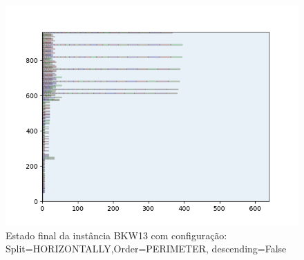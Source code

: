 \begin{figure}[H]
    \centering
    \caption[]{Estado final da instância BKW13 com configuração: Split=HORIZONTALLY,Order=PERIMETER, descending=False}
    \label{fig:bkw13-horizontally-perimeter-false}
    \includegraphics[scale=0.5]{output/figures/bkw/bkw13/horizontally/perimeter/false/0000}
\end{figure}